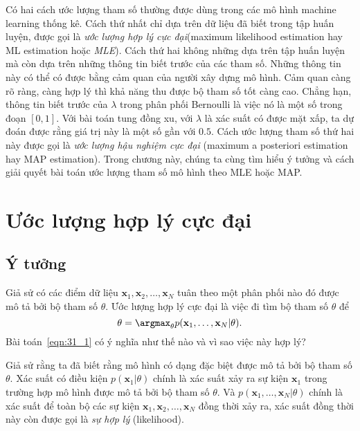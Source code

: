 
Có hai cách ước lượng tham số thường được dùng trong các mô hình machine
learning thống kê. Cách thứ nhất chỉ dựa trên dữ liệu đã biết trong tập huấn
luyện, được gọi là \textit{ước lượng hợp lý cực đại}({maximum likelihood
estimation} hay {ML estimation} hoặc \textit{MLE}). Cách thứ hai không
những dựa trên tập huấn luyện mà còn dựa trên những thông tin biết trước của các
tham số. Những thông tin này có thể có được bằng {cảm quan} của người xây dựng
mô hình. {Cảm quan} càng rõ ràng, càng hợp lý thì khả năng thu được bộ tham số
tốt càng cao. Chẳng hạn, thông tin biết trước của $\lambda$ trong phân phối
Bernoulli là việc nó là một số trong đoạn $[0, 1]$. Với bài toán tung đồng xu,
với $\lambda$ là xác suất có được mặt xấp, ta dự đoán được rằng giá trị này là
một số gần với $0.5$. Cách ước lượng tham số thứ hai này được gọi là \textit{ước
lượng hậu nghiệm cực đại} ({maximum a posteriori estimation} hay
{MAP estimation}). Trong chương này, chúng ta cùng tìm hiểu ý tưởng và
cách giải quyết bài toán ước lượng tham số mô hình theo {MLE} hoặc {MAP}.
 
 
\section{Ước lượng hợp lý cực đại}
\subsection{Ý tưởng}
Giả sử có các điểm dữ liệu $\mathbf{x}_1, \mathbf{x}_2, \dots, \mathbf{x}_N$ tuân theo một phân phối nào đó được mô tả bởi bộ tham số $\theta$. 
 Ước lượng hợp lý cực đại là việc đi tìm bộ tham số $\theta$ để
\begin{equation} 
\label{eqn:31_1}
\theta = \argmax_{\theta} p(\mathbf{x}_1, \dots, \mathbf{x}_N | \theta).
\end{equation} 
Bài toán~\eqref{eqn:31_1} có ý nghĩa như thế nào và vì sao việc này hợp lý? 

Giả sử rằng ta đã biết rằng mô hình có dạng đặc biệt được mô tả bởi bộ tham số
$\theta$. Xác suất có điều kiện $p(\mathbf{x}_1 | \theta)$ chính là xác suất xảy
ra {sự kiện} $\mathbf{x}_1$ trong trường hợp mô hình được mô tả bởi bộ tham số
$\theta$. Và $p(\mathbf{x}_1, \dots, \mathbf{x}_N | \theta)$ chính là xác suất
để toàn bộ các {sự kiện} $\mathbf{x}_1, \mathbf{x}_2, \dots, \mathbf{x}_N$ đồng
thời xảy ra, xác suất đồng thời này còn được gọi là \textit{sự hợp lý} ({likelihood}).

